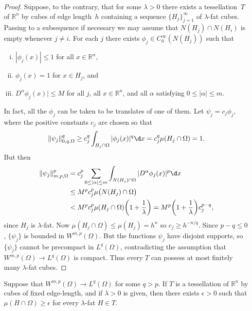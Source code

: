 \begin{proof}
  Suppose, to the contrary, that for some $\lambda>0$ there exists a tessellation~$T$
  of $\mathbb{R}^n$ by cubes of edge length~$h$ containing a sequence
  $\{H_j\}_{j=1}^\infty$ of $\lambda$-fat cubes.
  Passing to a subsequence if necessary we may assume that $N(H_j)\cap N(H_i)$
  is empty whenever $j\neq i$. For each $j$ there exists $\phi_j\in C_0^\infty(N(H_j))$
  such that
  \begin{enumerate}[(i)]
    \item $|\phi_j(x)|\leq 1$ for all $x\in \mathbb{R}^n$,
    \item $\phi_j(x) = 1$ for $x\in H_j$, and
    \item $D^\alpha \phi_j(x)|\leq M$ for all $j$, all $x\in \mathbb{R}^n$, and all $\alpha$ satisfying $0\leq |\alpha|\leq m$.
  \end{enumerate}
  In fact, all the $\phi_j$ can be taken to be translates of one of them.
  Let $\psi_j = c_j\phi_j$, where the positive constants $c_j$ are chosen so that
  \[ \|\psi_j\|_{0,q,\Omega}^q \geq c_j^q \int_{H_j\cap\Omega} |\phi_j(x)|^q \d x
      = c_j^q \mu(H_j\cap\Omega) = 1. \]
  But then
  \begin{align*}
    \|\psi_j\|_{m,p,\Omega}^p
    & = c_j^p \sum_{0\leq |\alpha|\leq m} \int_{N(H_j)\cap\Omega} |D^\alpha \phi_j(x)|^p \d x \\
    & \leq M^p c_j^p \mu\bigl(N(H_j)\cap\Omega\bigr) \\
    & < M^p c_j^p \mu(H_j\cap\Omega) \biggl(1+\frac{1}{\lambda}\biggr)
      = M^p \biggl(1+\frac{1}{\lambda}\biggr) c_j^{p-q},
  \end{align*}
  since $H_j$ is $\lambda$-fat. Now $\mu(H_j\cap\Omega)\leq \mu(H_j) = h^n$
  so $c_j\geq h^{-n/q}$. Since $p-q\leq 0$, $\{\psi_j\}$ is bounded in $W^{m,p}(\Omega)$.
  But the functions $\psi_j$ have disjoint supports, so $\{\psi_j\}$ cannot be precompact
  in $L^q(\Omega)$, contradicting the assumption that $W^{m,p}(\Omega)\to L^q(\Omega)$
  is compact. Thus every $T$ can possess at most finitely many $\lambda$-fat cubes.
\end{proof}


\begin{corollary}
  Suppose that $W^{m,p}(\Omega)\to L^q(\Omega)$ for some $q>p$.
  If $T$ is a tessellation of $\mathbb{R}^n$ by cubes of fixed edge-length,
  and if $\lambda>0$ is given, then there exists $\epsilon>0$ such that
  $\mu(H\cap\Omega)\geq\epsilon$ for every $\lambda$-fat $H\in T$.
\end{corollary}

